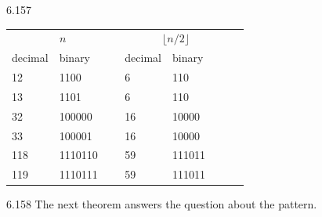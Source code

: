 \begin{Answer}{6.157}
\begin{tabular}{|l|l|l|l|l|}
\hline
\multicolumn{2}{|c|}{$n$}&
\multicolumn{2}{c|}{$\lfloor n/2\rfloor$}\\
decimal&binary\, \, \, \, \, &decimal&binary\, \, \, \, \,\\
\hline
\hline
12&1100&6&110\\
\hline
13&1101&6&110\\
\hline
32&100000&16&10000\\
\hline
33&100001&16&10000\\
\hline
118&1110110&59&111011\\
\hline
119&1110111&59&111011\\
\hline
\end{tabular}
\end{Answer}
\begin{Answer}{6.158}
The next theorem answers the question about the pattern.
\end{Answer}
